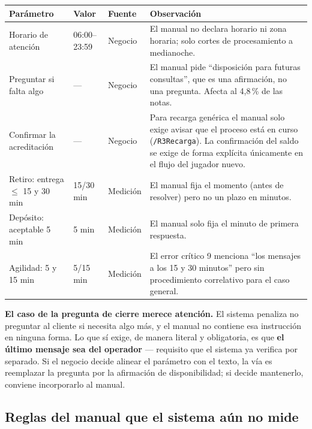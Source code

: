 \documentclass[11pt,a4paper]{article}
\newcommand{\cod}[1]{\texttt{\small #1}}
\begin{document}
\begin{center}
\begin{tabularx}{\textwidth}{@{}lllX@{}}
\toprule
\textbf{Parámetro} & \textbf{Valor} & \textbf{Fuente} & \textbf{Observación} \\
\midrule
Horario de atención & 06:00--23:59 & Negocio &
El manual no declara horario ni zona horaria; solo cortes de procesamiento a medianoche. \\
\addlinespace
Preguntar si falta algo & --- & Negocio &
El manual pide ``disposición para futuras consultas'', que es una afirmación, no una
pregunta. Afecta al 4,8\,\% de las notas. \\
\addlinespace
Confirmar la acreditación & --- & Negocio &
Para recarga genérica el manual solo exige avisar que el proceso está en curso
(\cod{/R3Recarga}). La confirmación del saldo se exige de forma explícita únicamente en el
flujo del jugador nuevo. \\
\addlinespace
Retiro: entrega $\le$ 15 y 30 min & 15/30 min & Medición &
El manual fija el momento (antes de resolver) pero no un plazo en minutos. \\
\addlinespace
Depósito: aceptable 5 min & 5 min & Medición &
El manual solo fija el minuto de primera respuesta. \\
\addlinespace
Agilidad: 5 y 15 min & 5/15 min & Medición &
El error crítico 9 menciona ``los mensajes a los 15 y 30 minutos'' pero sin procedimiento
correlativo para el caso general. \\
\bottomrule
\end{tabularx}
\end{center}

\begin{nota}
\textbf{El caso de la pregunta de cierre merece atención.} El sistema penaliza no preguntar
al cliente si necesita algo más, y el manual no contiene esa instrucción en ninguna forma.
Lo que sí exige, de manera literal y obligatoria, es que \textbf{el último mensaje sea del
operador} --- requisito que el sistema ya verifica por separado. Si el negocio decide
alinear el parámetro con el texto, la vía es reemplazar la pregunta por la afirmación de
disponibilidad; si decide mantenerlo, conviene incorporarlo al manual.
\end{nota}

\subsection{Reglas del manual que el sistema aún no mide}
\end{document}
